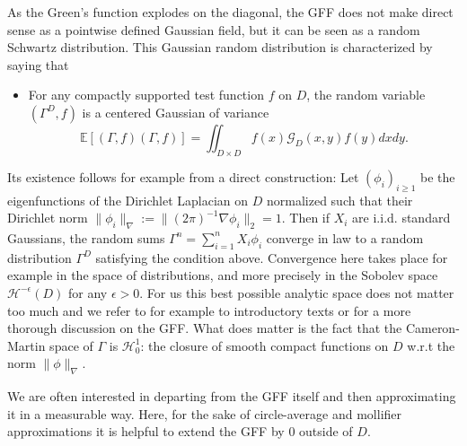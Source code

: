 \documentclass[11pt]{amsart}
\newcommand{\G}{\mathcal G}
\newcommand{\E}{\mathbb E}
\renewcommand{\1}{\mathbf 1}
\newcommand{\eps}{\epsilon}
\begin{document}
As the Green's function explodes on the diagonal, the GFF does not make direct sense as a pointwise defined Gaussian field, but it can be seen as a random Schwartz distribution. This Gaussian random distribution is characterized by saying that 
\begin{itemize}
\item For any compactly supported test function $f$ on $D$, the random variable $(\Gamma^D,f)$ is a centered Gaussian of variance
 $$ \E [(\Gamma,f) (\Gamma,f)]  =  \iint_{D\times D} f(x) \G_D(x,y) f(y) d x d y. $$  
\end{itemize}

Its existence follows for example from a direct construction:
Let $(\phi_i)_{i\geq 1}$ be the eigenfunctions of the Dirichlet Laplacian on $D$ normalized such that their Dirichlet norm $\| \phi_i \|_\nabla := \| (2\pi)^{-1}\nabla \phi_i \|_2 = 1$. Then if $X_i$ are i.i.d. standard Gaussians, the random sums $\Gamma^n = \sum_{i=1}^n X_i \phi_i$ converge in law to a random distribution $\Gamma^D$ satisfying the condition above. Convergence here takes place for example in the space of distributions, and more precisely in the Sobolev space $\mathcal{H}^{-\eps}(D)$ for any $\eps > 0$. For us this best possible analytic space does not matter too much and we refer to for example to introductory texts \cite{Gar,Berln} or \cite{She} for a more thorough discussion on the GFF. What does matter is the fact that the Cameron-Martin space of $\Gamma$ is $\mathcal{H}_0^{1}$: the closure of smooth compact functions on $D$ w.r.t the norm $\|\phi\|_\nabla$. 

We are often interested in departing from the GFF itself and then approximating it in a measurable way. Here, for the sake of circle-average and mollifier approximations it is helpful to extend the GFF by $0$ outside of $D$.
\end{document}
